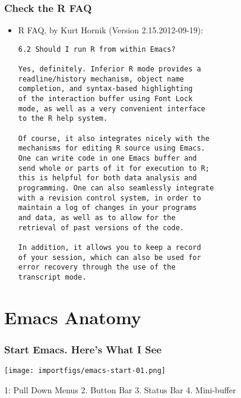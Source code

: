 \documentclass[11pt,english]{beamer}
\begin{document}
\begin{frame}
  \frametitle{Check the R FAQ}
  \begin{itemize}
  \item R FAQ, by Kurt Hornik (Version 2.15.2012-09-19):
    \begin{lstlisting}[basicstyle={\small}, xleftmargin=0in]
6.2 Should I run R from within Emacs?

Yes, definitely. Inferior R mode provides a 
readline/history mechanism, object name 
completion, and syntax-based highlighting 
of the interaction buffer using Font Lock 
mode, as well as a very convenient interface 
to the R help system.

Of course, it also integrates nicely with the 
mechanisms for editing R source using Emacs. 
One can write code in one Emacs buffer and 
send whole or parts of it for execution to R;
this is helpful for both data analysis and 
programming. One can also seamlessly integrate 
with a revision control system, in order to 
maintain a log of changes in your programs 
and data, as well as to allow for the 
retrieval of past versions of the code.  

In addition, it allows you to keep a record 
of your session, which can also be used for 
error recovery through the use of the 
transcript mode.
    \end{lstlisting}

  \end{itemize}
\end{frame}


\section{Emacs Anatomy}

\begin{frame}[containsverbatim]
  \frametitle{Start Emacs. Here's What I See}

  \texttt{[image: importfigs/emacs-start-01.png]}

  1: Pull Down Menus 2. Button Bar 3. Status Bar 4. Mini-buffer

\end{frame}
\end{document}
